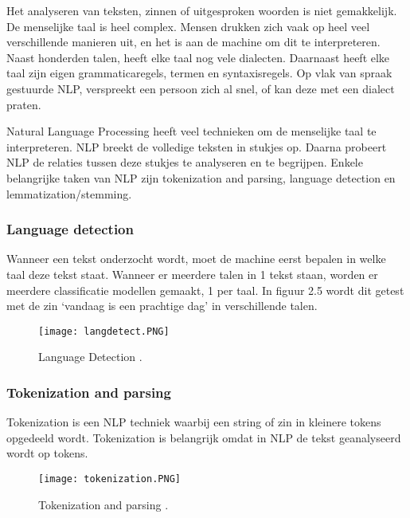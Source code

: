 Het analyseren van teksten, zinnen of uitgesproken woorden is niet gemakkelijk. De menselijke taal is heel complex. Mensen drukken zich vaak op heel veel verschillende manieren uit, en het is aan de machine om dit te interpreteren. Naast honderden talen, heeft elke taal nog vele dialecten. Daarnaast heeft elke taal zijn eigen grammaticaregels, termen en syntaxisregels.
Op vlak van spraak gestuurde NLP, verspreekt een persoon zich al snel, of kan deze met een dialect praten. \autocite{sas2020}

Natural Language Processing heeft veel technieken om de menselijke taal te interpreteren. NLP breekt de volledige teksten in stukjes op. Daarna probeert NLP de relaties tussen deze stukjes te analyseren en te begrijpen. Enkele belangrijke taken van NLP zijn tokenization and parsing, language detection en lemmatization/stemming. \autocite{sas2020}

\subsubsection{Language detection}
\label{sec:Languagedetection}

Wanneer een tekst onderzocht wordt, moet de machine eerst bepalen in welke taal deze tekst staat. Wanneer er meerdere talen in 1 tekst staan, worden er meerdere classificatie modellen gemaakt, 1 per taal. In figuur 2.5 wordt dit getest met de zin ‘vandaag is een prachtige dag' in verschillende talen. 

\begin{figure}[!htbp]
    \texttt{[image: langdetect.PNG]}
    \caption{\label{languagedetection}Language Detection \autocite{sas2020}.}
\end{figure}
\FloatBarrier

\subsubsection{Tokenization and parsing}
\label{sec:Tokenization}

Tokenization is een NLP techniek waarbij een string of zin in kleinere tokens opgedeeld wordt. Tokenization is belangrijk omdat in NLP de tekst geanalyseerd wordt op tokens. 

\begin{figure}[!htbp]
    \texttt{[image: tokenization.PNG]}
    \caption{\label{tokenization}Tokenization and parsing \autocite{sas2020}.}
\end{figure}
\FloatBarrier

